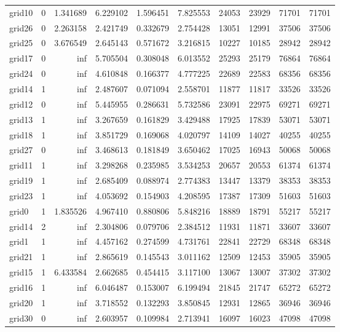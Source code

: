 \begin{longtable}{|l|r|r|r|r|r|r|r|r|r|}
grid10 & 0 & 1.341689 & 6.229102 & 1.596451 & 7.825553 & 24053 & 23929 & 71701 & 71701 \\
grid26 & 0 & 2.263158 & 2.421749 & 0.332679 & 2.754428 & 13051 & 12991 & 37506 & 37506 \\
grid25 & 0 & 3.676549 & 2.645143 & 0.571672 & 3.216815 & 10227 & 10185 & 28942 & 28942 \\
grid17 & 0 & inf & 5.705504 & 0.308048 & 6.013552 & 25293 & 25179 & 76864 & 76864 \\
grid24 & 0 & inf & 4.610848 & 0.166377 & 4.777225 & 22689 & 22583 & 68356 & 68356 \\
grid14 & 1 & inf & 2.487607 & 0.071094 & 2.558701 & 11877 & 11817 & 33526 & 33526 \\
grid12 & 0 & inf & 5.445955 & 0.286631 & 5.732586 & 23091 & 22975 & 69271 & 69271 \\
grid13 & 1 & inf & 3.267659 & 0.161829 & 3.429488 & 17925 & 17839 & 53071 & 53071 \\
grid18 & 1 & inf & 3.851729 & 0.169068 & 4.020797 & 14109 & 14027 & 40255 & 40255 \\
grid27 & 0 & inf & 3.468613 & 0.181849 & 3.650462 & 17025 & 16943 & 50068 & 50068 \\
grid11 & 1 & inf & 3.298268 & 0.235985 & 3.534253 & 20657 & 20553 & 61374 & 61374 \\
grid19 & 1 & inf & 2.685409 & 0.088974 & 2.774383 & 13447 & 13379 & 38353 & 38353 \\
grid23 & 1 & inf & 4.053692 & 0.154903 & 4.208595 & 17387 & 17309 & 51603 & 51603 \\
grid0 & 1 & 1.835526 & 4.967410 & 0.880806 & 5.848216 & 18889 & 18791 & 55217 & 55217 \\
grid14 & 2 & inf & 2.304806 & 0.079706 & 2.384512 & 11931 & 11871 & 33607 & 33607 \\
grid1 & 1 & inf & 4.457162 & 0.274599 & 4.731761 & 22841 & 22729 & 68348 & 68348 \\
grid21 & 1 & inf & 2.865619 & 0.145543 & 3.011162 & 12509 & 12453 & 35905 & 35905 \\
grid15 & 1 & 6.433584 & 2.662685 & 0.454415 & 3.117100 & 13067 & 13007 & 37302 & 37302 \\
grid16 & 1 & inf & 6.046487 & 0.153007 & 6.199494 & 21845 & 21747 & 65272 & 65272 \\
grid20 & 1 & inf & 3.718552 & 0.132293 & 3.850845 & 12931 & 12865 & 36946 & 36946 \\
grid30 & 0 & inf & 2.603957 & 0.109984 & 2.713941 & 16097 & 16023 & 47098 & 47098 \\

\end{longtable}
